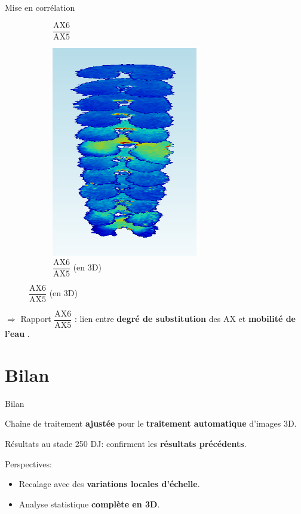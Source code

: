 \documentclass[10pt]{beamer}
\begin{document}
\begin{frame}{Mise en corrélation}
\begin{figure}[ht]
\begin{subfigure}[t]{0.33\textwidth}
      \caption{$\dfrac{\text{AX6}}{\text{AX5}}$}
      \label{subfig:zonetir_0}
    \end{subfigure}%
    \begin{subfigure}[t]{0.33\textwidth}
      \centering
      \includegraphics[width=0.7\textwidth]{fig/3D_250DJ}
      \caption{$\dfrac{\text{AX6}}{\text{AX5}}$ (en 3D)}
      \label{subfig:3D_250DJ}
    \end{subfigure}%

  \end{figure}

   $\Rightarrow$ Rapport $\dfrac{\text{AX6}}{\text{AX5}}$ : lien entre \textbf{degré de substitution} des AX et \textbf{mobilité de l'eau} \cite{Fanuel18}.

\end{frame}



\section{Bilan}

\begin{frame}{Bilan}

  Chaîne de traitement \textbf{ajustée} pour le \textbf{traitement
    automatique} d'images 3D.

  Résultats au stade 250 DJ: confirment les \textbf{résultats
    précédents}.

  \vspace{0.4cm}

  Perspectives:
  \begin{itemize}
  \item Recalage avec des \textbf{variations locales d'échelle}.
  \item Analyse statistique \textbf{complète en 3D}.
  \end{itemize}


\end{frame}
\end{document}

